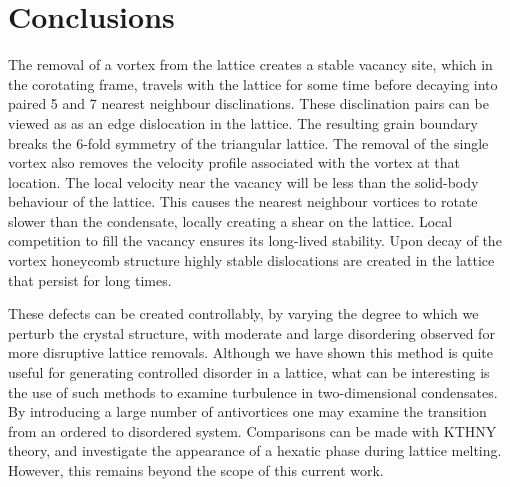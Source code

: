\section{Conclusions}\label{sec:Conclusions}

The removal of a vortex from the lattice creates a stable vacancy site, which in the corotating frame, travels with the lattice for some time before decaying into paired 5 and 7 nearest neighbour disclinations. These disclination pairs can be viewed as as an edge dislocation in the lattice. The resulting grain boundary breaks the 6-fold symmetry of the triangular lattice. The removal of the single vortex also removes the velocity profile associated with the vortex at that location. The local velocity near the vacancy will be less than the solid-body behaviour of the lattice. This causes the nearest neighbour vortices to rotate slower than the condensate, locally creating a shear on the lattice. Local competition to fill the vacancy ensures its long-lived stability. Upon decay of the vortex honeycomb structure highly stable dislocations are created in the lattice that persist for long times.

These defects can be created controllably, by varying the degree to which we perturb the crystal structure, with moderate and large disordering observed for more disruptive lattice removals. Although we have shown this method is quite useful for generating controlled disorder in a lattice, what can be interesting is the use of such methods to examine turbulence in two-dimensional condensates. By introducing a large number of antivortices one may examine the transition from an ordered to disordered system. Comparisons can be made with KTHNY theory, and investigate the appearance of a hexatic phase during lattice melting. However, this remains beyond the scope of this current work.
